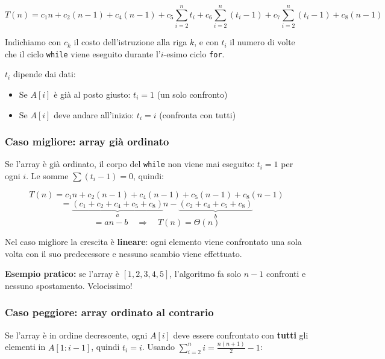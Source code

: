\[
T(n) = c_1 n + c_2(n-1) + c_4(n-1)
+ c_5 \sum_{i=2}^{n} t_i
+ c_6 \sum_{i=2}^{n} (t_i-1)
+ c_7 \sum_{i=2}^{n} (t_i-1)
+ c_8(n-1)
\]


Indichiamo con $c_k$ il costo dell'istruzione alla riga $k$,
e con $t_i$ il numero di volte che il ciclo \texttt{while} viene
eseguito durante l'$i$-esimo ciclo \texttt{for}.

\begin{nota}
	$t_i$ dipende dai dati:
	\begin{itemize}
		\item Se $A[i]$ è già al posto giusto: $t_i = 1$ (un solo confronto)
		\item Se $A[i]$ deve andare all'inizio: $t_i = i$ (confronta con tutti)
	\end{itemize}
\end{nota}

\pagebreak

\subsubsection*{Caso migliore: array già ordinato}

Se l'array è già ordinato, il corpo del \texttt{while} non viene
mai eseguito: $t_i = 1$ per ogni $i$.
Le somme $\sum(t_i - 1) = 0$, quindi:

\[
T(n) = c_1 n + c_2(n-1) + c_4(n-1) + c_5(n-1) + c_8(n-1)
\]
\[
= \underbrace{(c_1 + c_2 + c_4 + c_5 + c_8)}_{a} n
- \underbrace{(c_2 + c_4 + c_5 + c_8)}_{b}
\]
\[
= an - b \quad \Rightarrow \quad \boxed{T(n) = \Theta(n)}
\]

\begin{nota}
	Nel caso migliore la crescita è \textbf{lineare}: ogni elemento
	viene confrontato una sola volta con il suo predecessore e
	nessuno scambio viene effettuato.
	
	\textbf{Esempio pratico:} se l'array è $[1, 2, 3, 4, 5]$, l'algoritmo fa solo $n-1$ confronti e nessuno spostamento. Velocissimo!
\end{nota}

\subsubsection*{Caso peggiore: array ordinato al contrario}

Se l'array è in ordine decrescente, ogni $A[i]$ deve essere
confrontato con \textbf{tutti} gli elementi in $A[1:i-1]$,
quindi $t_i = i$. Usando $\sum_{i=2}^{n} i = \frac{n(n+1)}{2} - 1$:

